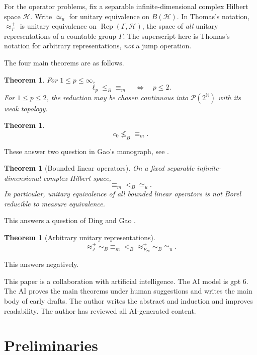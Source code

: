 \documentclass[11pt]{article}
\newtheorem{maintheorem}[theorem]{Theorem}
\theoremstyle{definition}
\newcommand{\N}{\mathbb N}
\newcommand{\Prob}{\mathcal P}
\newcommand{\leB}{\mathrel{\leq_B}}
\newcommand{\nleB}{\mathrel{\nleq_B}}
\newcommand{\Rep}{\operatorname{Rep}}
\begin{document}
For the operator problems, fix a separable infinite-dimensional complex
Hilbert space $\mathcal H$. Write $\simeq_u$ for unitary equivalence on
$B(\mathcal H)$. In Thomas's notation, $\approx^+_\Gamma$ is unitary
equivalence on $\Rep(\Gamma,\mathcal H)$, the space of \emph{all} unitary
representations of a countable group $\Gamma$. The superscript here is
Thomas's notation for arbitrary representations, \emph{not} a jump operation.

The four main theorems are as follows.

\begin{maintheorem}\label{main:lp}
For $1\leq p\leq\infty$,
\[
 \ell_p\leB{\equiv_m}\quad\Longleftrightarrow\quad p\leq2.
\]
For $1\leq p\leq2$, the reduction may be chosen continuous into
$\Prob(2^\N)$ with its weak topology.
\end{maintheorem}

\begin{maintheorem}\label{main:c0}
\[
 c_0\nleB{\equiv_m}.
\]
\end{maintheorem}

These answer two question in Gao's monograph, see \cite[Section 15.2]{Gao}.

\begin{maintheorem}[Bounded linear operators]\label{main:operators}
On a fixed separable infinite-dimensional complex Hilbert space,
\[
 {\equiv_m}<_B{\simeq_u}.
\]
In particular, unitary equivalence of all bounded linear operators is
not Borel reducible to measure equivalence.
\end{maintheorem}

This answers a question of Ding and Gao \cite{DG14}.

\begin{maintheorem}[Arbitrary unitary representations]\label{main:thomas}
\[
 {\approx^+_{\mathbb Z}}\sim_B{\equiv_m}
 <_B{\approx^+_{F_\infty}}\sim_B{\simeq_u}.
\]
\end{maintheorem}

This answers \cite[Question~8.2]{Thomas15} negatively.

This paper is a collaboration with artificial intelligence. The AI model is gpt 6. The AI proves the main theorems under human suggestions and writes the main body of early drafts. The author writes the abstract and induction and improves readability. The author has reviewed all AI-generated content.

\section{Preliminaries}\label{sec:prelim}
\end{document}
